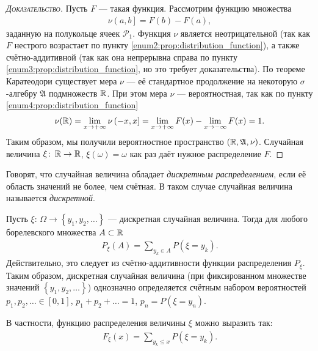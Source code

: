 \documentclass[../main.tex]{subfiles}
\begin{document}
\begin{proof}[\normalfont\textsc{Доказательство}]
 Пусть $F$ --- такая функция. Рассмотрим функцию множества
 \begin{align*}
  \nu \left(a, b\right] = F(b) - F(a),
 \end{align*} заданную на полукольце ячеек $ \mathcal P_1 $. Функция $ \nu $ является неотрицательной (так как $ F $ нестрого возрастает по пункту \ref{enum2:prop:distribution_function}), а также счётно-аддитивной (так как она непрерывна справа по пункту \ref{enum3:prop:distribution_function}, но это требует доказательства). По теореме Каратеодори существует мера $ \nu $ --- её стандартное продолжение на некоторую $ \sigma $-алгебру $ \mathfrak A $ подмножеств $ \mathbb{R} $. При этом мера $ \nu $ --- вероятностная, так как по пункту \ref{enum4:prop:distribution_function}
 \begin{align*}
  \nu(\mathbb{R}) = \lim_{x \to +\infty} \nu \left(-x, x\right] = \lim_{x \to +\infty} F(x) - \lim_{x \to -\infty} F(x) = 1. 
 \end{align*} Таким образом, мы получили вероятностное пространство $ (\mathbb{R},\mathfrak A, \nu) $. Случайная величина $ \xi \colon\, \mathbb{R} \to \mathbb{R} $, $ \xi(\omega) = \omega $ как раз даёт нужное распределение $ F $.
\end{proof}

\begin{df}
 Говорят, что случайная величина обладает \textit{дискретным распределением}, если её область значений не более, чем счётная. В таком случае случайная величина называется \textit{дискретной}.
\end{df}
\begin{prop*}
 Пусть $\xi \colon\, \Omega \to \left\{ y_1, y_2, \ldots \right\}$ --- дискретная случайная величина. Тогда для любого борелевского множества $ A \subset \mathbb{R} $
 \begin{align*}
  P_{\xi}(A) = \sum_{y_k \in A}  P(\xi = y_k)
 .\end{align*} Действительно, это следует из счётно-аддитивности функции распределения $ P_{\xi} $. Таким образом, дискретная случайная величина (при фиксированном множестве значений $ \left\{ y_1, y_2, \ldots \right\} $) однозначно определяется счётным набором вероятностей $ p_1, p_2, \ldots \in [0,1] $, $ p_1 + p_2 + \ldots = 1 $, $ p_n = P(\xi = y_n) $.

 В частности, функцию распределения величины $ \xi $ можно выразить так:
 \begin{align*}
  F_{\xi}(x) = \sum_{y_k \leqslant x} P(\xi = y_k).
 \end{align*} 
\end{prop*}
\end{document}
